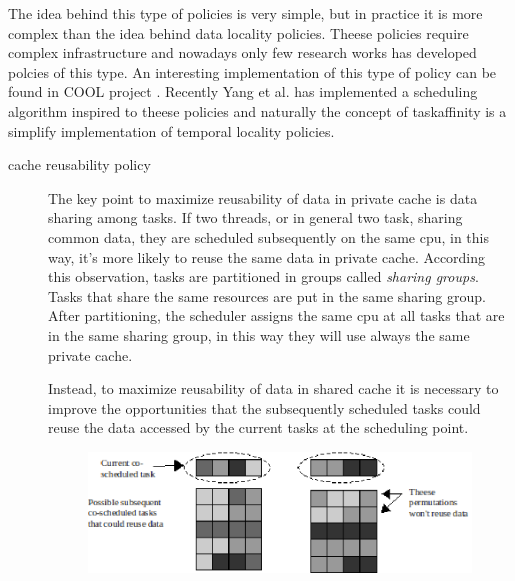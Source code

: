 The idea behind this type of policies is very simple, but in practice it is more complex than the idea behind data locality policies. Theese policies 
require complex infrastructure and nowadays only few research works has developed polcies of this type. An interesting implementation of this type of policy
can be found in COOL project \cite{COOL}. Recently Yang et al. \cite{taiwan} has implemented a scheduling algorithm inspired to theese policies and 
naturally the concept of taskaffinity is a simplify implementation of temporal locality policies.

\begin{description}
\item[cache reusability policy]
The key point to maximize reusability of data in private cache is data sharing among tasks. If two threads, or in general two task, sharing common data, 
they are scheduled subsequently on the same cpu, in this way, it's more likely to reuse the same data in private cache.
According this observation, tasks are partitioned in groups called \textit{sharing groups}. Tasks that share the same resources are put in the 
same sharing group. After partitioning, the scheduler assigns the same cpu at all tasks that are in the same sharing group, in this way they will use 
always the same private cache. 

Instead, to maximize reusability of data in shared cache it is necessary to improve the opportunities that the subsequently scheduled tasks could reuse the 
data accessed by the current tasks at the scheduling point.

\begin{figure}[htbp]
\centering
\includegraphics[width=\widefigure]{images/cosched_permutation.eps}
\caption{}
\label{fig:cosched_permutation}
\end{figure}


\end{description}
